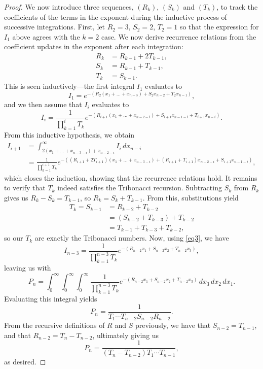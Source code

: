 \documentclass[10pt,a4paper]{amsart}
\begin{document}
\begin{proof}
  We now introduce three sequences, $(R_k)$, $(S_k)$ and $(T_k)$, to track the coefficients of the terms in the exponent during the inductive process of successive integrations. First, let $R_2=3$, $S_2=2$, $T_2=1$ so that the expression for $I_1$ above agrees with the $k=2$ case. We now derive recurrence relations from the coefficient updates in the exponent after each integration:
  \begin{align*}
    R_{k} &= R_{k-1} + 2T_{k-1}, \\
    S_k &= R_{k-1} + T_{k-1}, \\
    T_{k} &= S_{k-1}.
  \end{align*}
  This is seen inductively---the first integral $I_1$ evaluates to \[
    I_1 = e^{-(R_2(x_1 + \dots + x_{n-3}) + S_2 x_{n-2} + T_2 x_{n-1})},
  \] and we then assume that $I_i$ evaluates to
  \begin{equation} \label{eq3}
    I_i = \frac{1}{\prod_{k=1}^{i} T_k} e^{-(R_{i+1}(x_1 + \dots + x_{n-2-i}) + S_{i+1} x_{n-1-i} + T_{i+1}x_{n-i})}.
  \end{equation}
  From this inductive hypothesis, we obtain
  \begin{align*}
    I_{i+1} &= \int_{2(x_1+\dots+x_{n-3-i}) + x_{n-2-i}}^{\infty} I_i\, dx_{n-i} \\
            &= \frac{1}{\prod_{k=1}^{i+1} T_k} e^{-((R_{i+1} + 2T_{i+1})(x_1 + \dots + x_{n-3-i}) + (R_{i+1} + T_{i+1})x_{n-2-i} + S_{i+1}x_{n-1-i})},
  \end{align*}
  which closes the induction, showing that the recurrence relations hold. It remains to verify that $T_k$ indeed satisfies the Tribonacci recursion. Subtracting $S_k$ from $R_k$ gives us $R_k - S_k = T_{k-1}$, so $R_k = S_k + T_{k-1}$. From this, substitutions yield 
  \begin{align*}
    T_k = S_{k-1} &= R_{k-2} + T_{k-2} \\
                  &= (S_{k-2} + T_{k-3}) + T_{k-2} \\
                  &= T_{k-1} + T_{k-3} + T_{k-2},
  \end{align*}
  so our $T_k$ are exactly the Tribonacci numbers. Now, using \eqref{eq3}, we have \[
    I_{n-3} = \frac{1}{\prod_{k = 1}^{n-3} T_k} e^{-(R_{n-2}x_1 + S_{n-2}x_2 + T_{n-2}x_3)}
  ,\] leaving us with
  \begin{equation*}
    P_n = \int_{0}^{\infty} \int_{0}^{\infty} \int_{0}^{\infty} \frac{1}{\prod_{k = 1}^{n-3} T_k} e^{-(R_{n-2}x_1 + S_{n-2}x_2 + T_{n-2}x_3)} \, dx_3\, dx_2\, dx_1.
  \end{equation*}
  Evaluating this integral yields \[
    P_n = \frac{1}{T_1 \cdots T_{n-2} S_{n-2} R_{n-2}}
    .\] From the recursive definitions of $R$ and $S$ previously, we have that $S_{n-2} = T_{n-1}$, and that $R_{n-2} = T_{n} - T_{n-2}$, ultimately giving us \[
    P_n = \frac{1}{(T_n - T_{n-2})T_1\cdots T_{n-1}}
  ,\] as desired.
\end{proof}
\end{document}
